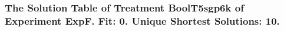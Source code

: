 \begin{frame}
 \fontsize{8pt}{9pt}\selectfont
 \frametitle{ The Solution Table of Treatment BoolT5sgp6k of Experiment ExpF. Fit: 0. Unique Shortest Solutions: 10. }

 \label{ExpFSolutionTable007.tex}  
 \end{frame}

